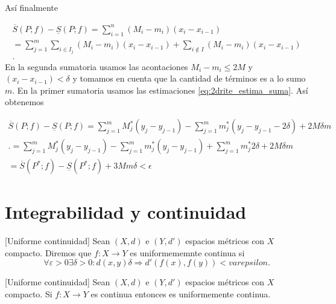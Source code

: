 \begin{demo}
Así finalmente

\begin{multline*}\label{eq:crite2_cuentas}
 \overline{S}(P;f)-\underline{S}(P;f)=\sum_{i=1}^n(M_i-m_i)(x_i-x_{i-1})\\
 =\sum_{j=1}^m \sum_{i\in I_j}(M_i-m_i)(x_i-x_{i-1})+ \sum_{i\notin I}(M_i-m_i)(x_i-x_{i-1})\\  .
\end{multline*}
En la segunda sumatoria usamos las acontaciones $M_i-m_i\leq 2M$ y $(x_i-x_{i-1})<\delta$ y tomamos en cuenta que la cantidad de términos es a lo sumo $m$. En la primer sumatoria usamos las estimaciones \eqref{eq:2drite_estima_suma}. Así obtenemos

\begin{multline*}\label{eq:crite2_cuentas}
 \overline{S}(P;f)-\underline{S}(P;f)
 =\sum_{j=1}^m  M^*_j(y_j-y_{j-1})-\sum_{j=1}^m  m^*_j(y_j-y_{j-1}-2\delta)+ 2M\delta m\\ 
 . =\sum_{j=1}^m  M^*_j(y_j-y_{j-1})-\sum_{j=1}^m  m^*_j(y_j-y_{j-1})+ \sum_{j=1}^m m^*_j 2\delta +2M\delta m\\ 
 = \overline{S}(P^*;f)-\underline{S}(P^*;f)+3Mm\delta<\epsilon
\end{multline*}
 
\end{demo}



\section{Integrabilidad y continuidad}


\begin{definicion}{}[Uniforme continuidad]  Sean $(X,d)$ e $(Y,d')$ espacios métricos con $X$ compacto. Diremos que $f:X\to Y$ es uniformememnte continua si 
\[
 \forall\varepsilon>0\exists \delta>0:d(x,y)\delta\Rightarrow d'(f(x),f(y))<varepsilon.
\]

 
\end{definicion}

\begin{teorema}{}[Uniforme continuidad] 
 Sean $(X,d)$ e $(Y,d')$ espacios métricos con $X$ compacto. Si $f:X\to Y$ es continua entonces es uniformemente continua.

\end{teorema}

